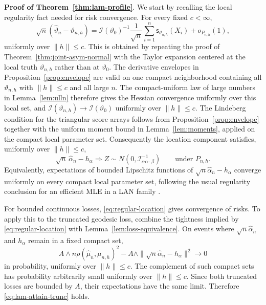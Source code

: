 \documentclass[11pt]{article}
\newcommand{\score}{\mathsf{s}}
\newcommand{\info}{\mathcal{I}}
\begin{document}
\medskip
\noindent \textbf{Proof of Theorem~\ref{thm:lam-profile}}. We start by recalling the local regularity fact needed for risk convergence. For every fixed $c<\infty$,
\begin{equation}
\label{eq:uniform-local-linear}
\sqrt n(\hat\vartheta_n-\vartheta_{n,h})
=
\info(\vartheta_0)^{-1}
\frac1{\sqrt n}\sum_{i=1}^n \score_{\vartheta_{n,h}}(X_i)+o_{P_{n,h}}(1),
\end{equation}
uniformly over $\|h\|\le c$. This is obtained by repeating the proof of Theorem~\ref{thm:joint-asym-normal} with the Taylor expansion centered at the local truth $\vartheta_{n,h}$ rather than at $\vartheta_0$. The derivative envelopes in Proposition~\ref{prop:envelope} are valid on one compact neighborhood containing all $\vartheta_{n,h}$ with $\|h\|\le c$ and all large $n$. The compact-uniform law of large numbers in Lemma~\ref{lem:ulln} therefore gives the Hessian convergence uniformly over this local set, and $\info(\vartheta_{n,h})\to\info(\vartheta_0)$ uniformly over $\|h\|\le c$. The Lindeberg condition for the triangular score arrays follows from Proposition~\ref{prop:envelope} together with the uniform moment bound in Lemma~\ref{lem:moments}, applied on the compact local parameter set. Consequently the location component satisfies, uniformly over $\|h\|\le c$,
\begin{equation}
\label{eq:regular-location}
\sqrt n\,\hat\alpha_n-h_\alpha
\Rightarrow
Z\sim N(0,\info_{\alpha\alpha\cdot\beta}^{-1})
\qquad\text{under }P_{n,h}.
\end{equation}
Equivalently, expectations of bounded Lipschitz functions of $\sqrt n\hat\alpha_n-h_\alpha$ converge uniformly on every compact local parameter set, following the usual regularity conclusion for an efficient MLE in a LAN family \citep[Secs.~8.4 and 9.8]{vandervaart_1998_AsymptoticStatistics}.

For bounded continuous losses, \eqref{eq:regular-location} gives convergence of risks. To apply this to the truncated geodesic loss, combine the tightness implied by \eqref{eq:regular-location} with Lemma~\ref{lem:loss-equivalence}. On events where $\sqrt n\hat\alpha_n$ and $h_\alpha$ remain in a fixed compact set,
\[
A\wedge n\rho(\hat\mu_n,\mu_{n,h})^2
-
A\wedge \|\sqrt n\hat\alpha_n-h_\alpha\|^2
\to 0
\]
in probability, uniformly over $\|h\|\le c$. The complement of such compact sets has probability arbitrarily small uniformly over $\|h\|\le c$. Since both truncated losses are bounded by $A$, their expectations have the same limit. Therefore \eqref{eq:lam-attain-trunc} holds.
\end{document}
